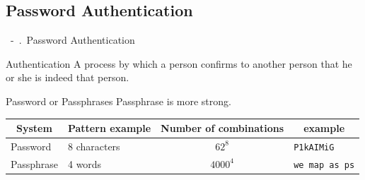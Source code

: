 \documentclass{beamer}
\newcommand{\shownum}{\thesection\ -\ \thesubsection.\ }
\begin{document}
\subsection{Password Authentication}
\begin{frame}{\shownum Password Authentication}
    \begin{exampleblock}{Authentication}
        A process by which a person confirms to another person that he or she is indeed that person.
    \end{exampleblock}
    \begin{block}{Password or Passphrases}
        Passphrase is more strong.
        \begin{table}
            \centering
            \renewcommand{\arraystretch}{1.5}
            \begin{tabular}{llcl}
                \multicolumn{1}{c}{System} & \multicolumn{1}{c}{Pattern example} & Number of combinations & \multicolumn{1}{c}{example}    \\
                \hline
                Password                   & 8 characters                        & \(62^8\)               & {\tt P1kAIMiG}                 \\
                Passphrase                 & 4 words\ \footnotemark              & \(4000^4\)             & {\scriptsize \tt we map as ps}
            \end{tabular}
        \end{table}
    \end{block}
\end{frame}
\end{document}
